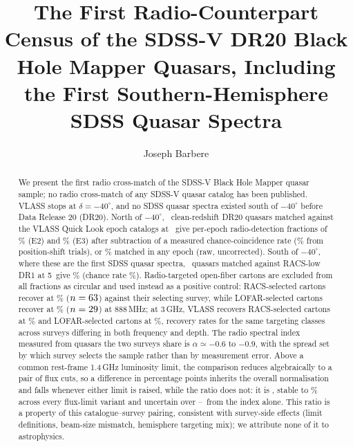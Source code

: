 \documentclass[twocolumn]{aastex631}
\begin{document}
\title{The First Radio-Counterpart Census of the SDSS-V DR20 Black Hole Mapper Quasars,
Including the First Southern-Hemisphere SDSS Quasar Spectra}
\author[0009-0008-3289-4447]{Joseph Barbere}

\begin{abstract}
We present the first radio cross-match of the SDSS-V Black Hole Mapper quasar sample;
no radio cross-match of any SDSS-V quasar catalog has been published. VLASS
stops at $\delta = -40^\circ$, and no SDSS quasar spectra existed south of $-40^\circ$ before
Data Release 20 (DR20). North of $-40^\circ$,
\drNorthCensus\ clean-redshift DR20 quasars matched against the VLASS Quick Look epoch
catalogs at \drAlphaVlassRad\arcsec\ give per-epoch radio-detection fractions of \drNorthEtwoPct\%
(E2) and \drNorthEthreePct\% (E3) after subtraction of a measured chance-coincidence rate
(\drNorthFmPct\% from position-shift trials), or \drNorthAnyPct\% matched in any epoch (raw,
uncorrected). South of $-40^\circ$, where these are the first SDSS quasar spectra,
\drSouthCensus\ quasars matched against RACS-low DR1 at
5\arcsec\ give \drSouthPct\% (chance rate \drSouthFmPct\%). Radio-targeted open-fiber
cartons are excluded from all fractions as circular and used instead as a positive control:
RACS-selected cartons recover at \drCartonRacsPct\% ($n=63$) against their
selecting survey, while LOFAR-selected cartons recover at \drCartonLofarPct\%
($n=29$) at 888\,MHz; at 3\,GHz, VLASS recovers RACS-selected cartons at
\drCartonVlassRacsPct\% and LOFAR-selected cartons at \drCartonVlassLofarPct\%,
recovery rates for the same targeting classes across surveys differing in both frequency
and depth. The radio
spectral index measured from quasars the two surveys share is $\alpha \simeq -0.6$ to
$-0.9$, with the spread set by which survey selects the sample rather than by measurement error. Above
a common rest-frame 1.4\,GHz luminosity limit, the comparison reduces algebraically to a
pair of flux cuts, so a difference in percentage points inherits the overall normalisation
and falls whenever either limit is raised, while the ratio does not: it is \drRatioMeas, stable to
\drRatioLimSpreadPct\% across every flux-limit variant and uncertain over
\drRatioAlphaLo--\drRatioAlphaHi\ from the index alone. This ratio is a property of this
catalogue--survey pairing, consistent with survey-side effects (limit definitions,
beam-size mismatch, hemisphere targeting mix); we attribute none of it to astrophysics.
\end{abstract}
\end{document}
